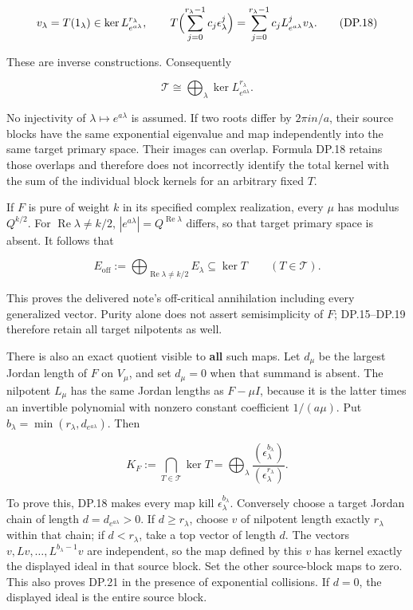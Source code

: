 \[
v_\lambda=T(1_\lambda)\in
 \ker L_{e^{a\lambda}}^{r_\lambda},
\qquad
T\Bigl(\sum_{j=0}^{r_\lambda-1}c_j\epsilon_\lambda^j\Bigr)
=\sum_{j=0}^{r_\lambda-1}c_jL_{e^{a\lambda}}^jv_\lambda.
\tag{DP.18}
\]

These are inverse constructions. Consequently

\[
\mathscr T\cong
\bigoplus_\lambda\ker L_{e^{a\lambda}}^{r_\lambda}.
\tag{DP.19}
\]

No injectivity of \(\lambda\mapsto e^{a\lambda}\) is assumed. If two roots differ by \(2\pi i n/a\), their source blocks have the same exponential eigenvalue and map independently into the same target primary space. Their images can overlap. Formula DP.18 retains those overlaps and therefore does not incorrectly identify the total kernel with the sum of the individual block kernels for an arbitrary fixed \(T\).

If \(F\) is pure of weight \(k\) in its specified complex realization, every \(\mu\) has modulus \(Q^{k/2}\). For \(\operatorname{Re}\lambda\ne k/2\), \(|e^{a\lambda}|=Q^{\operatorname{Re}\lambda}\) differs, so that target primary space is absent. It follows that

\[
E_{\mathrm{off}}:=\bigoplus_{\operatorname{Re}\lambda\ne k/2}E_\lambda
\subseteq\ker T
\qquad(T\in\mathscr T).
\tag{DP.20}
\]

This proves the delivered note's off-critical annihilation including every generalized vector. Purity alone does not assert semisimplicity of \(F\); DP.15--DP.19 therefore retain all target nilpotents as well.

There is also an exact quotient visible to \textbf{all} such maps. Let \(d_\mu\) be the largest Jordan length of \(F\) on \(V_\mu\), and set \(d_\mu=0\) when that summand is absent. The nilpotent \(L_\mu\) has the same Jordan lengths as \(F-\mu I\), because it is the latter times an invertible polynomial with nonzero constant coefficient \(1/(a\mu)\). Put \(b_\lambda=\min(r_\lambda,d_{e^{a\lambda}})\). Then

\[
K_F:=\bigcap_{T\in\mathscr T}\ker T
=\bigoplus_\lambda
 \frac{(\epsilon_\lambda^{b_\lambda})}
      {(\epsilon_\lambda^{r_\lambda})}.
\tag{DP.21}
\]

To prove this, DP.18 makes every map kill \(\epsilon_\lambda^{b_\lambda}\). Conversely choose a target Jordan chain of length \(d=d_{e^{a\lambda}}>0\). If \(d\ge r_\lambda\), choose \(v\) of nilpotent length exactly \(r_\lambda\) within that chain; if \(d<r_\lambda\), take a top vector of length \(d\). The vectors \(v,Lv,\ldots,L^{b_\lambda-1}v\) are independent, so the map defined by this \(v\) has kernel exactly the displayed ideal in that source block. Set the other source-block maps to zero. This also proves DP.21 in the presence of exponential collisions. If \(d=0\), the displayed ideal is the entire source block.

